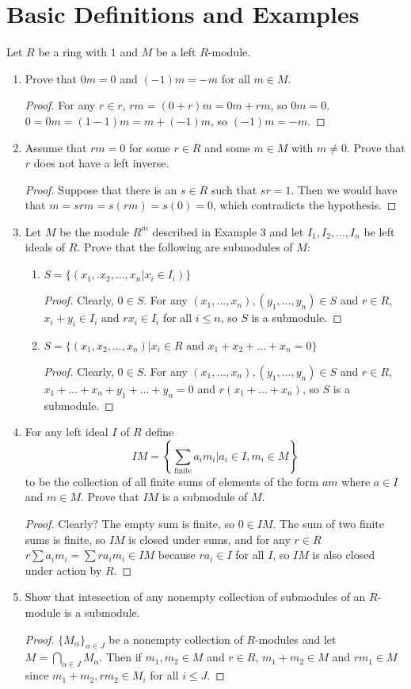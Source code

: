 \documentclass{report}
\begin{document}
\section{Basic Definitions and Examples}
Let $R$ be a ring with $1$ and $M$ be a left $R$-module.
\begin{enumerate} 
	\item  Prove that $0m=0$ and $(-1)m=-m$ for all $m \in M$.
		\begin{proof}
			 For any $r\in r$, $rm=(0+r)m=0m + rm$, so $0m=0$. $0=0m=(1-1)m=m+(-1)m$, so $(-1)m=-m$.
		\end{proof}
	\setcounter{enumi}{2}
	\item Assume that $rm=0$ for some $r\in R$ and some $m\in M$ with $m\neq 0$. Prove that $r$ does not have a left inverse.
		\begin{proof}
			Suppose that there is an $s\in R$ such that $sr=1$. Then we would have that $m=srm=s(rm)=s(0)=0$, which contradicts the hypothesis.
		\end{proof}
	\item Let $M$ be the module $R^m$ described in Example 3 and let $I_1,I_2,...,I_n$ be left ideals of $R$. Prove that the following are submodules of $M$:
		\begin{enumerate} [label=(\alph*)]
			\item $S=\{(x_1,.x_2,...,x_n|x_i\in I_i)\}$
				\begin{proof}
					Clearly, $0\in S$. For any $(x_1,...,x_n),(y_1,...,y_n)\in S$ and $r\in R$, $x_i+y_i\in I_i$ and $rx_i\in I_i$ for all $i\leq n$, so $S$ is a submodule.
				\end{proof}
			\item $S=\{(x_1,x_2,...,x_n)|x_i\in R \text{ and } x_1+x_2+...+x_n=0\}$
				\begin{proof}
					Clearly, $0\in S$. For any $(x_1,...,x_n),(y_1,...,y_n)\in S$ and $r\in R$, $x_1+...+x_n+y_1+...+y_n=0$ and $r(x_1+...+x_n)$, so $S$ is a submodule.
				\end{proof}
		\end{enumerate}
	\item For any left ideal $I$ of $R$ define
		$$IM = \left\{\sum_{\text{finite}}a_im_i|a_i\in I, m_i\in M\right \}$$
	to be the collection of all finite sums of elements of the form $am$ where $a\in I$ and $m\in M$. Prove that $IM$ is a submodule of $M$.	
	\begin{proof}
		Clearly? The empty sum is finite, so $0\in IM$. The sum of two finite sums is finite, so $IM$ is closed under sums, and for any $r\in R$ $r\sum a_im_i=\sum ra_im_i \in IM$ because $ra_i\in I$ for all $I$,
		so $IM$ is also closed under action by $R$.
	\end{proof}
	\item Show that	intesection of any nonempty collection of submodules of an $R$-module is a submodule.
		\begin{proof}
			 $\{M_\alpha\}_{\alpha\in J}$ be a nonempty collection of $R$-modules and let $M=\bigcap_{\alpha\in J}M_\alpha$.
			 Then if $m_1, m_2\in M$ and $r \in R$, $m_1+m_2\in M$ and $rm_1\in M$ since $m_1+m_2,rm_2 \in M_i$ for all $i \leq J$.
		\end{proof}
		\newpage


\end{enumerate}
\end{document}

